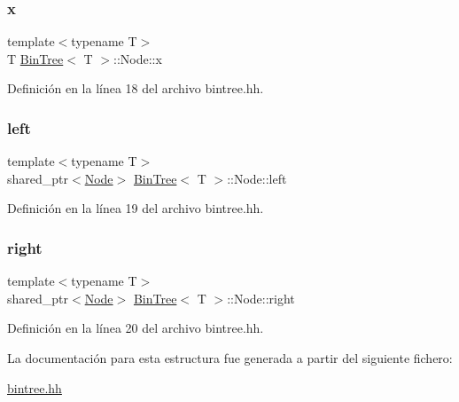 \subsubsection{\texorpdfstring{x}{x}}
{\footnotesize\ttfamily template$<$typename T$>$ \\
T \mbox{\hyperlink{class_bin_tree}{Bin\+Tree}}$<$ T $>$\+::Node\+::x}



Definición en la línea 18 del archivo bintree.\+hh.

\mbox{\label{struct_bin_tree_1_1_node_a265a6367635a38838e6a6366564be78d}} 
\subsubsection{\texorpdfstring{left}{left}}
{\footnotesize\ttfamily template$<$typename T$>$ \\
shared\+\_\+ptr$<$\mbox{\hyperlink{struct_bin_tree_1_1_node}{Node}}$>$ \mbox{\hyperlink{class_bin_tree}{Bin\+Tree}}$<$ T $>$\+::Node\+::left}



Definición en la línea 19 del archivo bintree.\+hh.

\mbox{\label{struct_bin_tree_1_1_node_a6df770137090da60cd0376ce06893cbd}} 
\subsubsection{\texorpdfstring{right}{right}}
{\footnotesize\ttfamily template$<$typename T$>$ \\
shared\+\_\+ptr$<$\mbox{\hyperlink{struct_bin_tree_1_1_node}{Node}}$>$ \mbox{\hyperlink{class_bin_tree}{Bin\+Tree}}$<$ T $>$\+::Node\+::right}



Definición en la línea 20 del archivo bintree.\+hh.



La documentación para esta estructura fue generada a partir del siguiente fichero\+:\begin{DoxyCompactItemize}
\item 
\mbox{\hyperlink{bintree_8hh}{bintree.\+hh}}\end{DoxyCompactItemize}
